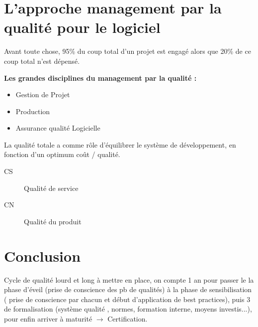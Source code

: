 \section{L’approche management par la qualité pour le logiciel}

Avant toute chose,  95\% du coup total d’un projet est engagé alors que 20\% de ce coup total n’est dépensé.

\textbf{Les grandes disciplines du management par la qualité :}\hfill\\
\begin{itemize}
	\item Gestion de Projet
	\item Production
	\item Assurance qualité Logicielle
\end{itemize}

La qualité totale a comme rôle d’équilibrer le système de développement, en fonction d’un optimum coût / qualité.

\begin{description}
\item[CS] Qualité de service
\item[CN] Qualité du produit
\end{description}

\section{Conclusion}

Cycle de qualité lourd et long  à mettre en place, on compte 1 an pour passer le la phase d’éveil (prise de conscience des pb de qualités) à la phase de sensibilisation ( prise de conscience par chacun et début d’application de best practices), puis 3 de formalisation (système qualité , normes, formation interne, moyens investis...), pour enfin arriver à maturité $\rightarrow$ Certification.
